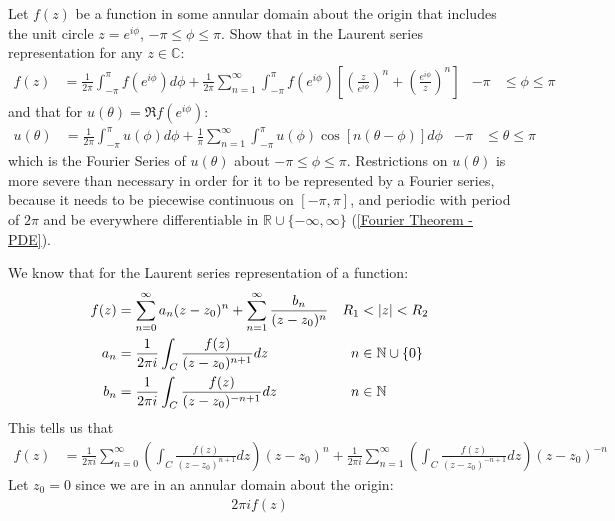 \documentclass[12pt, english]{book}
\makeatletter
\renewenvironment{proof}[1][\proofname]{\par
	\pushQED{\qed}%
	\normalfont \topsep6\p@\@plus6\p@\relax
	\list{}{%
		\settowidth{\leftmargin}{\itshape\proofname:\hskip\labelsep}%
		\setlength{\labelwidth}{0pt}%
		\setlength{\itemindent}{-\leftmargin}%
		}%
	\item[\hskip\labelsep\itshape#1\@addpunct{:}]\ignorespaces
	}{\popQED\endlist\@endpefalse}
\makeatother
\begin{document}
	\begin{example}
		Let \(f(z)\) be a function in some annular domain about the origin that includes the unit circle \(z = e^{i\phi}\), \(-\pi \leq \phi \leq \pi\). Show that in the Laurent series representation for any \(z \in \mathbb{C}\):
		\begin{align*}
			f(z) &= \frac{1}{2\pi} \int_{-\pi}^{\pi} f(e^{i\phi}) d \phi
				+ \frac{1}{2\pi} \sum_{n=1}^{\infty} \int_{-\pi}^{\pi} f(e^{i\phi}) \left[\left(\frac{z}{e^{i\phi}}\right)^n + \left(\frac{e^{i\phi}}{z}\right)^n\right]
				& -\pi &\leq \phi \leq \pi
		\end{align*}
		and that for \(u(\theta) = \Re{f(e^{i\phi})}\):
		\begin{align*}
			u(\theta) &= \frac{1}{2\pi} \int_{-\pi}^{\pi} u(\phi) d \phi
				+ \frac{1}{\pi} \sum_{n=1}^{\infty} \int_{-\pi}^{\pi} u(\phi) \cos[n(\theta-\phi)] d\phi
				& -\pi &\leq \theta \leq \pi
		\end{align*}
		which is the Fourier Series of \(u(\theta)\) about \(-\pi \leq \phi \leq \pi\). Restrictions on \(u(\theta)\) is more severe than necessary in order for it to be represented by a Fourier series, because it needs to be piecewise continuous on \([-\pi,\pi]\), and periodic with period of \(2\pi\) and be everywhere differentiable in \(\mathbb{R}\cup\{-\infty, \infty\}\) (\cref{Fourier Theorem - PDE}).
		\begin{proof}
			{\color{Grey}
			We know that for the Laurent series representation of a function:
			\begin{align*}
				f(z) &= \sum_{n=0}^{\infty} a_n(z-z_0)^n + \sum_{n=1}^{\infty} \frac{b_n}{(z-z_0)^n}
					& R_1 &< \abs{z} < R_2 \\
				a_n &= \frac{1}{2\pi i} \int_{C} \frac{f(z)}{(z-z_0)^{n+1}} dz
					& n &\in \mathbb{N} \cup \{0\} \\
				b_n &= \frac{1}{2\pi i} \int_{C} \frac{f(z)}{(z-z_0)^{-n+1}} dz 
					& n &\in \mathbb{N}
			\end{align*}
			This tells us that 
			\begin{align*}
				f(z) &= \frac{1}{2\pi i} \sum_{n=0}^{\infty} 
				\left( \int_{C} \frac{f(z)}{(z-z_0)^{n+1}} dz \right) (z-z_0)^n
				+ \frac{1}{2\pi i} \sum_{n=1}^{\infty} \left(\int_{C} \frac{f(z)}{(z-z_0)^{-n+1}} dz \right) (z-z_0)^{-n}
			\end{align*}
			Let \(z_0 = 0\) since we are in an annular domain about the origin:
			\begin{align*}
				2\pi i f(z) 

\end{align*}}
\end{proof}
\end{example}
\end{document}
